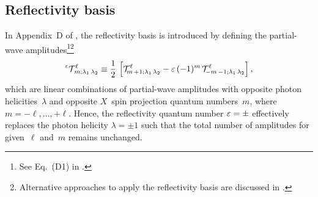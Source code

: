 \subsection{Reflectivity basis}%
\label{sec:photoprod:reflectivity}

In Appendix~D of , the reflectivity basis is
introduced by defining the partial-wave amplitudes\footnote{See
Eq.~(D1) in .}\footnote{Alternative
approaches to apply the reflectivity basis are discussed in
.}
\begin{equation}
  \label{eq:photoprod_amplitude_refl}
  \prescript{\refl}{}{\mathcal{T}}^\ell_{\!m; \lambda_1\, \lambda_2}
  \equiv \frac{1}{2}\, \sBrk{\mathcal{T}^\ell_{\!m\, {+1}; \lambda_1\, \lambda_2}
  - \refl\, (-1)^m\, \mathcal{T}^\ell_{\!{-m}\, {-1}; \lambda_1\, \lambda_2}},
\end{equation}
which are linear combinations of partial-wave amplitudes with opposite
photon helicities~$\lambda$ and opposite $X$~spin projection quantum
numbers~$m$, where $m = -\ell, \ldots, +\ell$.  Hence, the
reflectivity quantum number $\varepsilon = \pm$ effectively replaces the
photon helicity $\lambda = \pm 1$ such that the total number of
amplitudes for given~$\ell$ and~$m$ remains unchanged.

